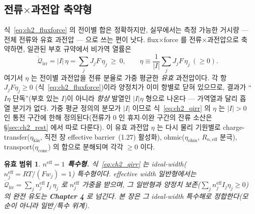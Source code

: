 \documentclass[11pt,a4paper]{article}
\newtheorem*{boundbox}{유효 범위}
\newcommand{\eff}{\mathrm{eff}}
\newcommand{\irr}{\mathrm{irr}}
\newcommand{\kin}{\mathrm{kin}}
\newcommand{\ohm}{\mathrm{ohm}}
\newcommand{\conc}{\mathrm{conc}}
\begin{document}
\subsection{전류$\times$과전압 축약형}\label{sec:ch2_Ieta}
식~\eqref{eq:ch2_fluxforce} 의 전이별 합은 정확하지만, 실무에서는 측정 가능한 거시량 — 전체 전류와 유효 과전압 —
으로 쓰는 편이 낫다. flux$\times$force 를 전류$\times$과전압으로 축약하면, 일관된 부호 규약에서 비가역 열률은
\begin{equation}
\boxed{\;\dot{\mathcal Q}_{\irr}=|I|\,\eta=\sum_j J_jF\,\eta_j\ \ge\ 0,\qquad \eta\equiv\frac{1}{|I|}\sum_j J_jF\,\eta_j\ (\ge0).\;}
\label{eq:ch2_qirr}
\end{equation}
여기서 $\eta$ 는 전이별 과전압을 전류 분율로 가중 평균한 \emph{유효} 과전압이다. 각 항 $J_jF\eta_j\ge0$
(식~\eqref{eq:ch2_fluxforce})이라 양정치가 이미 항별로 닫혀 있으므로, 결과가 ``$I\eta$ 단독''(부호 있는 $I$)이
아니라 \emph{항상} 발열인 $|I|\eta$ 형으로 나온다 — 가역열과 달리 흡열 분기가 없다. 가중 평균 정의의 분모가
$|I|$ 이므로 식~\eqref{eq:ch2_qirr} 의 $\eta$ 는 $|I|>0$ 인 통전 구간에 한해 정의된다(전류가 0 인 휴지$\cdot$이완
구간의 잔류 소산은 \S\ref{sec:ch2_rest} 에서 따로 다룬다). 이 유효 과전압 $\eta$ 는 다시
물리 기원별로 charge-transfer($\eta_\kin$, 직전 장 effective barrier~(1.27) 활성화), ohmic($\eta_\ohm$,
$R_{n,\eff}$ 분극), transport($\eta_\conc$) 의 합으로 분해되며 각각 $\ge0$ 이다.
\begin{boundbox}
\textbf{$n^{\eff}=1$ 특수형.} 식~\eqref{eq:ch2_qirr} 는 ideal-width($n_j^{\eff}=RT/(Fw_j)=1$) 특수형이다.
effective width 일반형에서는 $\dot{\mathcal Q}_{\irr}=\sum_j n_j^{\eff}\,I_j\,\eta_j$ 로 $n_j^{\eff}$ 가중을
받으며, 그 일반형과 양정치 보존($\sum_j n_j^{\eff}I_j\eta_j\ge0$)의 완전 유도는 \textbf{Chapter 4} 로 넘긴다.
본 장은 그 ideal-width 특수해로 정합한다(모순이 아니라 일반/특수 위계).
\end{boundbox}
\end{document}

